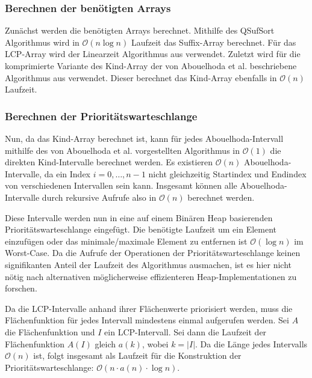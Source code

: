 \subsubsection{Berechnen der benötigten Arrays}

Zunächst werden die benötigten Arrays berechnet. Mithilfe des QSufSort Algorithmus \cite{larsson_faster_2007} wird in $\mathcal{O}(n \log n)$ Laufzeit das Suffix-Array berechnet. Für das LCP-Array wird der Linearzeit Algorithmus aus \cite{kasai_linear-time_2001} verwendet. Zuletzt wird für die komprimierte Variante des Kind-Array der von Abouelhoda et al. beschriebene Algorithmus aus \cite{abouelhoda_optimal_2002} verwendet. Dieser berechnet das Kind-Array ebenfalls in $\mathcal{O}(n)$ Laufzeit.

\subsubsection{Berechnen der Prioritätswarteschlange}

Nun, da das Kind-Array berechnet ist, kann für jedes Abouelhoda-Intervall mithilfe des von Abouelhoda et al. vorgestellten Algorithmus in $\mathcal{O}(1)$ die direkten Kind-Intervalle berechnet werden. Es existieren $\mathcal{O}(n)$ Abouelhoda-Intervalle, da ein Index $i = 0,\dots,n - 1$ nicht gleichzeitig Startindex und Endindex von verschiedenen Intervallen sein kann. Insgesamt können alle Abouelhoda-Intervalle durch rekursive Aufrufe also in $\mathcal{O}(n)$ berechnet werden.

Diese Intervalle werden nun in eine auf einem Binären Heap \cite{williams_algorithm_1964} basierenden Prioritätswarteschlange eingefügt. Die benötigte Laufzeit um ein Element einzufügen oder das minimale/maximale Element zu entfernen ist $\mathcal{O}(\log n)$ im Worst-Case. Da die Aufrufe der Operationen der Prioritätswarteschlange keinen signifikanten Anteil der Laufzeit des Algorithmus ausmachen, ist es hier nicht nötig nach alternativen möglicherweise effizienteren Heap-Implementationen zu forschen.

Da die LCP-Intervalle anhand ihrer Flächenwerte priorisiert werden, muss die Flächenfunktion für jedes Intervall mindestens einmal aufgerufen werden. Sei $A$ die Flächenfunktion und $I$ ein LCP-Intervall. Sei dann die Laufzeit der Flächenfunktion $A(I)$ gleich $a(k)$, wobei $k = |I|$. 
Da die Länge jedes Intervalls $\mathcal{O}(n)$ ist, folgt insgesamt als Laufzeit für die Konstruktion der Prioritätswarteschlange: $\mathcal{O}(n \cdot a(n) \cdot \log n)$.\\\\

